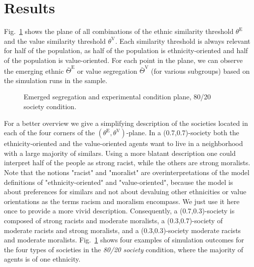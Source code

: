\documentclass{ws-acs}
\begin{document}
\section{Results}

Fig.~\ref{fig:80_20} shows the plane of all combinations of the ethnic similarity threshold $\theta^\text{E}$ and the value similarity threshold  $\theta^\text{V}$. Each similarity threshold is always relevant for half of the population, as half of the population is ethnicity-oriented and half of the population is value-oriented. For each point in the plane, we can observe the emerging ethnic $\bar\Theta^\text{E}$ or value segregation $\bar\Theta^\text{V}$ (for various subgroups) based on the simulation runs in the sample. 

\begin{figure}[th]
\centerline{}
\vspace*{8pt}
\caption{Emerged segregation and experimental condition plane, 80/20 society condition.}
\label{fig:80_20}
\end{figure}

For a better overview we give a simplifying description of the societies located in each of the four corners of the $(\theta^\text{E},\theta^\text{V})$-plane. In a (0.7,0.7)-society both the ethnicity-oriented and the value-oriented agents want to live in a neighborhood with a large majority of similars. Using a more blatant description one could interpret half of the people as strong racist, while the others are strong moralists. Note that the notions "racist" and "moralist" are overinterpretations of the model definitions of "ethnicity-oriented" and "value-oriented", because the model is about preferences for similars and not about devaluing other ethnicities or value orientations as the terms racism and moralism encompass. We just use it here once to provide a more vivid description. Consequently, a (0.7,0.3)-society is composed of strong racists and moderate moralists, a (0.3,0.7)-society of moderate racists and strong moralists, and a (0.3,0.3)-society moderate racists and moderate moralists.  Fig.~\ref{fig:80_20} shows four examples of simulation outcomes for the four types of societies in the {\it 80/20 society} condition, where the majority of agents is of one ethnicity. 
\end{document}
